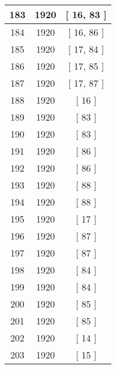 \begin{center}
\begin{longtable}[H]{|| c c c ||}
\hline
183 & 1920 & [ 16, 83 ] \\ 
\hline
184 & 1920 & [ 16, 86 ] \\ 
\hline
185 & 1920 & [ 17, 84 ] \\ 
\hline
186 & 1920 & [ 17, 85 ] \\ 
\hline
187 & 1920 & [ 17, 87 ] \\ 
\hline
188 & 1920 & [ 16 ] \\ 
\hline
189 & 1920 & [ 83 ] \\ 
\hline
190 & 1920 & [ 83 ] \\ 
\hline
191 & 1920 & [ 86 ] \\ 
\hline
192 & 1920 & [ 86 ] \\ 
\hline
193 & 1920 & [ 88 ] \\ 
\hline
194 & 1920 & [ 88 ] \\ 
\hline
195 & 1920 & [ 17 ] \\ 
\hline
196 & 1920 & [ 87 ] \\ 
\hline
197 & 1920 & [ 87 ] \\ 
\hline
198 & 1920 & [ 84 ] \\ 
\hline
199 & 1920 & [ 84 ] \\ 
\hline
200 & 1920 & [ 85 ] \\ 
\hline
201 & 1920 & [ 85 ] \\ 
\hline
202 & 1920 & [ 14 ] \\ 
\hline
203 & 1920 & [ 15 ] \\ 
\hline
\end{longtable}
\end{center}
